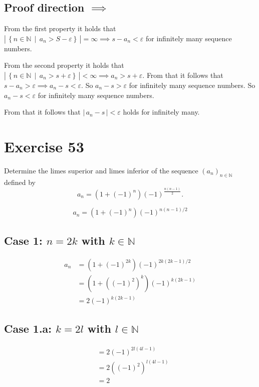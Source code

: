 \documentclass[a4paper]{article}
\theoremstyle{definition}
\newcommand\setdef[2]{\left\{#1\,\middle|\,#2\right\}}
\newcommand\card[1]{\left|\,#1\,\right|}
\newcommand\seq[1]{\left(#1\right)_{n\in\mathbb N}}
\begin{document}
\subsection{Proof direction $\implies$}

From the first property it holds that
$\card{\setdef{n \in \mathbb N}{a_n > S - \varepsilon}} = \infty \implies s - a_n < \varepsilon$
for infinitely many sequence numbers.

From the second property it holds that
$\card{\setdef{n \in \mathbb N}{a_n > s + \varepsilon}} < \infty \implies a_n > s + \varepsilon$.
From that it follows that $s - a_n > \varepsilon \implies a_n - s < \varepsilon$.
So $a_n - s > \varepsilon$ for infinitely many sequence numbers.
So $a_n - s < \varepsilon$ for infinitely many sequence numbers.

From that it follows that $\card{a_n - s} < \varepsilon$ holds for infinitely many.

\section{Exercise 53}
\begin{ex}
  Determine the limes superior and limes inferior of the sequence $\seq{a_n}$
  defined by
  \[ a_n = \left(1 + (-1)^n\right) (-1)^{\frac{n (n-1)}{2}}. \]
\end{ex}

\[ a_n = (1 + (-1)^n) (-1)^{n(n-1)/2} \]

\subsection{Case 1: $n = 2k$ with $k \in \mathbb N$}
%
\begin{align*}
  a_n &= \left(1 + (-1)^{2k}\right) (-1)^{2k (2k - 1) / 2} \\
    &= \left(1 + \left((-1)^2\right)^k\right) (-1)^{k (2k - 1)} \\
    &= 2 (-1)^{k (2k - 1)}
\end{align*}

\subsection{Case 1.a: $k = 2l$ with $l \in \mathbb N$}
%
\begin{align*}
    &= 2 (-1)^{2l (4l - 1)} \\
    &= 2 \left((-1)^2\right)^{l (4l - 1)} \\
    &= 2
\end{align*}
\end{document}
